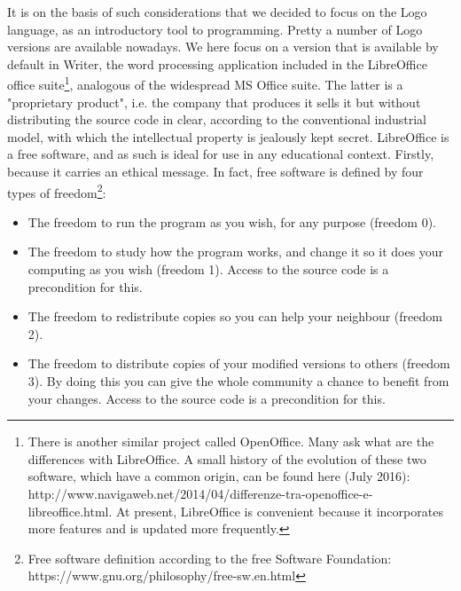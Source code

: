 It is on the basis of such considerations that we decided to focus on the Logo language, as an introductory tool to programming. Pretty a number of Logo versions are available nowadays. We here focus on a version that is available by default in Writer, the word processing application included in the LibreOffice office suite\footnote{There is another similar project called OpenOffice. Many ask what are the differences with LibreOffice. A small history of the evolution of these two software, which have a common origin, can be found here (July 2016): http://www.navigaweb.net/2014/04/differenze-tra-openoffice-e-libreoffice.html. At present, LibreOffice is convenient because it incorporates more features and is updated more frequently.}, analogous of the widespread MS Office suite. The latter is a "proprietary product", i.e. the company that produces it sells it but without distributing the source code in clear, according to the conventional industrial model, with which the intellectual property is jealously kept secret. LibreOffice is a free software, and as such is ideal for use in any educational context. Firstly, because it carries an ethical message. In fact, free software is defined by four types of freedom\footnote{Free software definition according to the free Software Foundation: https://www.gnu.org/philosophy/free-sw.en.html}:

\begin{itemize}
\item The freedom to run the program as you wish, for any purpose (freedom 0).
\item The freedom to study how the program works, and change it so it does your computing as you wish (freedom 1). Access to the source code is a precondition for this.
\item The freedom to redistribute copies so you can help your neighbour (freedom 2).
\item The freedom to distribute copies of your modified versions to others (freedom 3). By doing this you can give the whole community a chance to benefit from your changes. Access to the source code is a precondition for this.
\end{itemize}

